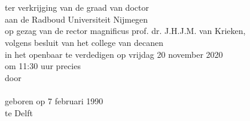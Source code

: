\newpage

\thispagestyle{empty}
\vspace*{0em}
\begin{center}
\huge{}\\[6.5em]


\normalsize

{\Large\scshape{}}\\[2.5em]


ter verkrijging van de graad van doctor\\
aan de Radboud Universiteit Nijmegen\\
op gezag van de rector magnificus prof. dr. J.H.J.M. van Krieken,\\
volgens besluit van het college van decanen\\
in het openbaar te verdedigen op vrijdag 20 november 2020\\
om 11:30 uur precies\\[1.5em]

door\\[1.5em]

{\Large\scshape{}}\\[1.5em]

geboren op 7 februari 1990\\
te Delft
\end{center}
\newpage
\thispagestyle{empty}

\noindent

